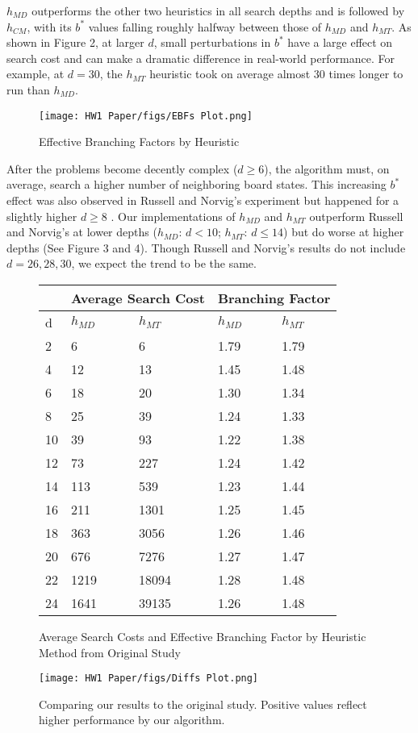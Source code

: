 \noindent $h_{MD}$ outperforms the other two heuristics in all search depths and is followed by $h_{CM}$, with its $b^{*}$ values falling roughly halfway between those of $h_{MD}$ and $h_{MT}$. As shown in Figure 2, at larger $d$, small perturbations in $b^{*}$ have a large effect on search cost and can make a dramatic difference in real-world performance. For example, at $d=30$, the $h_{MT}$ heuristic took on average almost 30 times longer to run than $h_{MD}$.\\

\begin{figure}
    \centering
    \texttt{[image: HW1 Paper/figs/EBFs Plot.png]}
    \caption{Effective Branching Factors by Heuristic}
    \label{fig:my_label}
\end{figure}

\noindent After the problems become decently complex ($d \geq 6$), the algorithm must, on average, search a higher number of neighboring board states. This increasing $b^{*}$ effect was also observed in Russell and Norvig's experiment but happened for a slightly higher $d \geq 8$ \cite{aima}. Our implementations of $h_{MD}$ and $h_{MT}$ outperform Russell and Norvig's at lower depths ($h_{MD}$: $d < 10$; $h_{MT}$: $d \leq 14$) but do worse at higher depths (See Figure 3 and 4). Though Russell and Norvig's results do not include $d=26,28,30$, we expect the trend to be the same.\\

\begin{figure}
    \centering
    \begin{tabular}{|l||l|l||l|l|}
    \hline
        & \multicolumn{2}{|c|}{Average Search Cost} &
           \multicolumn{2}{|c|}{Branching Factor} \\ \hline
        d & $h_{MD}$  & $h_{MT}$ & $h_{MD}$ &  $h_{MT}$ \\ \hline
        2 & 6 & 6 & 1.79 & 1.79 \\ \hline
        4 & 12 & 13 & 1.45 & 1.48 \\ \hline
        6 & 18 & 20 & 1.30 & 1.34 \\ \hline
        8 & 25 & 39 & 1.24 & 1.33 \\ \hline
        10 & 39 & 93 & 1.22 & 1.38 \\ \hline
        12 & 73 & 227 & 1.24 & 1.42 \\ \hline
        14 & 113 & 539 & 1.23 & 1.44 \\ \hline
        16 & 211 & 1301 & 1.25 & 1.45 \\ \hline
        18 & 363 & 3056 & 1.26 & 1.46 \\ \hline
        20 & 676 & 7276 & 1.27 & 1.47 \\ \hline
        22 & 1219 & 18094 & 1.28 & 1.48 \\ \hline
        24 & 1641 & 39135 & 1.26 & 1.48 \\ \hline
    \end{tabular}


    \caption{Average Search Costs and Effective Branching Factor by Heuristic Method from Original Study \cite{aima}}
\end{figure}

\begin{figure}
    \centering
    \texttt{[image: HW1 Paper/figs/Diffs Plot.png]}
    \caption{Comparing our results to the original study. Positive values reflect higher performance by our algorithm.
}
    \label{fig:my_label}
\end{figure}